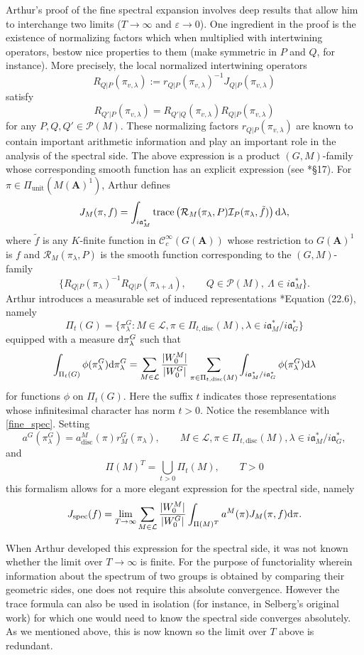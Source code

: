 \documentclass[11pt]{amsart}
\def\A{\mathbf A}
\def\CCC{\mathcal C}
\def\III{\mathcal I}
\def\LLL{\mathcal L}
\def\PPP{\mathcal P}
\def\aaa{\mathfrak a}
\def\d{\text d}
\def\mod#1{\lvert #1 \rvert} %
\def\RRR{\mathcal R}
\def\trace{\operatorname{trace}}
\theoremstyle{remark}
\begin{document}
Arthur's proof of the fine spectral expansion involves deep results that allow him to interchange two limits ($T \to \infty$ and $\varepsilon \to 0$). One ingredient in the proof is the existence of normalizing factors which when multiplied with intertwining operators, bestow nice properties to them (make symmetric in $P$ and $Q$, for instance). More precisely, the local normalized intertwining operators
\[ R_{Q|P}(\pi_{v, \lambda}) := r_{Q|P}(\pi_{v, \lambda})^{-1} J_{Q|P}(\pi_{v, \lambda}) \]
satisfy
\[ R_{Q'|P}(\pi_{v, \lambda}) = R_{Q'|Q}(\pi_{v, \lambda}) R_{Q|P}(\pi_{v, \lambda}) \]
for any $P, Q, Q' \in \PPP(M)$. These normalizing factors $r_{Q|P}(\pi_{v, \lambda})$ are known to contain important arithmetic information and play an important role in the analysis of the spectral side. The above expression is a product $(G, M)$-family whose corresponding smooth function has an explicit expression (see \cite{clay}*{\S 17}). For $\pi \in \Pi_{\text{unit}}(M(\A)^1)$, Arthur defines 
\[ J_M(\pi, f) = \int_{i\aaa_M^*} \trace \left( \RRR_M(\pi_\lambda, P) \III_P(\pi_\lambda, \tilde f) \right) \d \lambda, \]
where $\tilde f$ is any $K$-finite function in $\CCC_c^\infty(G(\A))$ whose restriction to $G(\A)^1$ is $f$ and $\RRR_M(\pi_\lambda, P)$ is the smooth function corresponding to the $(G, M)$-family
\[ \{ R_{Q|P}(\pi_\lambda)^{-1} R_{Q|P}(\pi_{\lambda + \Lambda}), \qquad Q \in \PPP(M), \ \Lambda \in i\aaa_M^* \}. \]
Arthur introduces a measurable set of induced representations \cite{clay}*{Equation (22.6)}, namely
\[ \Pi_t(G) = \{ \pi_\lambda^G : M \in \LLL, \pi \in \Pi_{t, \text{disc}}(M), \lambda \in i\aaa_M^*/i\aaa_G^*  \} \]
equipped with a measure $\d \pi_\lambda^G$ such that 
\[ \int_{\Pi_t(G)} \phi(\pi_\lambda^G) \d \pi_\lambda^G = \sum_{M \in \LLL} \frac{\mod{W_0^M}}{\mod{W_0^G}} 
	\sum_{\pi \in \Pi_{t, \text{disc}}(M)} \int_{i\aaa_M^* / i\aaa_G^*} \phi(\pi_\lambda^G) \d \lambda \]
for functions $\phi$ on $\Pi_t(G)$. Here the suffix $t$ indicates those representations whose infinitesimal character has norm $t>0$. Notice the resemblance with \cref{fine_spec}. Setting
\[ a^G(\pi_\lambda^G) = a_{\text{disc}}^M(\pi) r_M^G(\pi_\lambda), \qquad M \in \LLL, \pi \in \Pi_{t, \text{disc}}(M), \lambda \in i\aaa_M^* / i\aaa_G^*, \]
and 
\[ \Pi(M)^T = \bigcup_{t > 0} \Pi_t(M), \qquad T > 0 \]
this formalism allows for a more elegant expression for the spectral side, namely
\[ J_{\text{spec}}(f) = \lim_{T \to \infty} \sum_{M \in \LLL} \frac{\mod{W_0^M}}{\mod{W_0^G}} \int_{\Pi(M)^T} a^M(\pi) J_M(\pi, f) \d \pi. \]

When Arthur developed this expression for the spectral side, it was not known whether the limit over $T \to \infty$ is finite. For the purpose of functoriality wherein information about the spectrum of two groups is obtained by comparing their geometric sides, one does not require this absolute convergence. However the trace formula can also be used in isolation (for instance, in Selberg's original work) for which one would need to know the spectral side converges absolutely. As we mentioned above, this is now known \cite{FLM} so the limit over $T$ above is redundant. 
\end{document}

